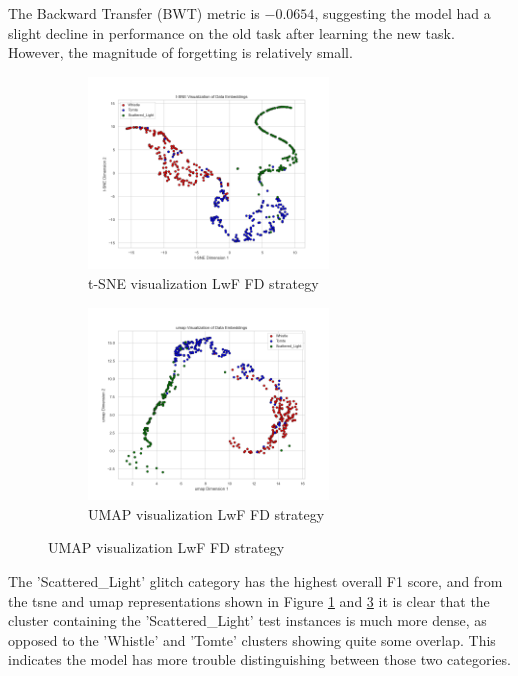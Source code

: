 The Backward Transfer (BWT) metric is $-0.0654$, suggesting the model had a slight decline in performance on the old task after learning the new task. However, the magnitude of forgetting is relatively small. 

\begin{figure}[!ht]
\centering
\begin{subfigure}
  \centering
    \includegraphics[width=0.7\textwidth]{Images/tSNE_FractalDimension_LwF_test.png}
    \caption{t-SNE visualization LwF FD strategy}
    \label{fig:tSNE_FD_LwF}
\end{subfigure}
\begin{subfigure}
  \centering
    \includegraphics[width=0.7\textwidth]{Images/umap_FractalDimension_LwF_test.png}
    \caption{UMAP visualization LwF FD strategy}
    \label{fig:umap_FD_LwF}
\end{subfigure}
\end{figure}

The 'Scattered\_Light' glitch category has the highest overall F1 score, and from the \acrshort{tsne} and \acrshort{umap} representations shown in Figure \ref{fig:tSNE_FD_LwF} and \ref{fig:umap_FD_LwF} it is clear that the cluster containing the 'Scattered\_Light' test instances is much more dense, as opposed to the 'Whistle' and 'Tomte' clusters showing quite some overlap. This indicates the model has more trouble distinguishing between those two categories. 

